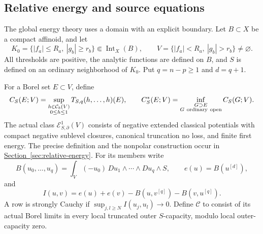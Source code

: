 \documentclass[11pt,reqno]{amsart}
\theoremstyle{definition}
\theoremstyle{remark}
\numberwithin{equation}{section}
\newcommand{\Cb}{\mathcal C_b}
\newcommand{\Ccone}{\mathscr C}
\newcommand{\MathSecref}[1]{\begingroup\hypersetup{linkcolor=SectionLink}\hyperref[#1]{Section~\ref*{#1}}\endgroup}
\begin{document}
\subsection{Relative energy and source equations}

The global energy theory uses a domain with an explicit boundary.
Let $B\subset X$ be a compact affinoid, and let
\begin{equation}\label{eq:main-box}
 K_0=\{|f_a|\le R_a,\ |g_b|\ge r_b\}
       \Subset\operatorname{Int}_X(B),\qquad
 V=\{|f_a|<R_a,\ |g_b|>r_b\}\ne\varnothing.
\end{equation}
All thresholds are positive, the analytic functions are defined on $B$,
and $S$ is defined on an ordinary neighborhood of $K_0$.
Put $q=n-p\ge1$ and $d=q+1$.

For a Borel set $E\subset V$, define
\[
 C_S(E;V)=\sup_{\substack{h\in\Cb(V)\\0\le h\le1}}
                  T_{S,q}(h,\ldots,h)(E),\qquad
 C_S^*(E;V)=\inf_{\substack{G\supset E\\G\ {\rm ordinary\ open}}}
                         C_S(G;V).
\]
The actual class $\mathcal E^1_{S,\partial}(V)$ consists of negative
extended classical potentials with compact negative sublevel closures,
canonical truncation no loss, and finite first energy. The precise
definition and the nonpolar construction occur in
\MathSecref{sec:relative-energy}. For its members write
\[
 B(u_0,\ldots,u_q)=\int_V(-u_0)\,D u_1\wedge\cdots\wedge D u_q\wedge S,
 \qquad e(u)=B(u^{[d]}),
\]
and
\[
 I(u,v)=e(u)+e(v)-B(u,v^{[q]})-B(v,u^{[q]}).
\]
A row is strongly Cauchy if
$\sup_{j,l\ge N}I(u_j,u_l)\to0$. Define $\Ccone$ to consist of its
actual Borel limits in every local truncated outer $S$-capacity,
modulo local outer-capacity zero.
\end{document}
